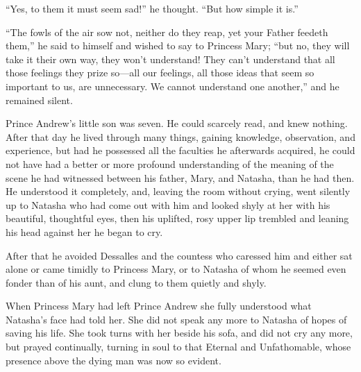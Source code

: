 ``Yes, to them it must seem sad!'' he thought. ``But how simple
it is.''

``The fowls of the air sow not, neither do they reap, yet your
Father feedeth them,'' he said to himself and wished to say to
Princess Mary; ``but no, they will take it their own way, they
won't understand! They can't understand that all those feelings
they prize so---all our feelings, all those ideas that seem so
important to us, are unnecessary.  We cannot understand one
another,'' and he remained silent.

Prince Andrew's little son was seven. He could scarcely read, and
knew nothing. After that day he lived through many things,
gaining knowledge, observation, and experience, but had he
possessed all the faculties he afterwards acquired, he could not
have had a better or more profound understanding of the meaning
of the scene he had witnessed between his father, Mary, and
Natasha, than he had then. He understood it completely, and,
leaving the room without crying, went silently up to Natasha who
had come out with him and looked shyly at her with his beautiful,
thoughtful eyes, then his uplifted, rosy upper lip trembled and
leaning his head against her he began to cry.

After that he avoided Dessalles and the countess who caressed him
and either sat alone or came timidly to Princess Mary, or to
Natasha of whom he seemed even fonder than of his aunt, and clung
to them quietly and shyly.

When Princess Mary had left Prince Andrew she fully understood
what Natasha's face had told her. She did not speak any more to
Natasha of hopes of saving his life. She took turns with her
beside his sofa, and did not cry any more, but prayed
continually, turning in soul to that Eternal and Unfathomable,
whose presence above the dying man was now so evident.


